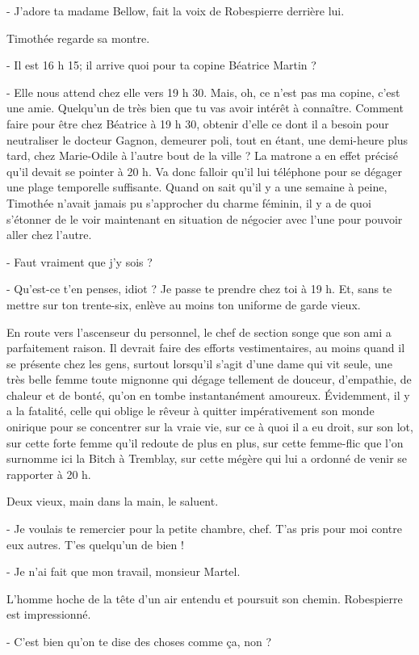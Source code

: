 - J’adore ta madame Bellow, fait la voix de Robespierre derrière lui.

Timothée regarde sa montre.

- Il est 16 h 15; il arrive quoi pour ta copine Béatrice Martin ?

- Elle nous attend chez elle vers 19 h 30. Mais, oh, ce n’est pas ma copine, c’est une amie. Quelqu’un de très bien que tu vas avoir intérêt à connaître.
Comment faire pour être chez Béatrice à 19 h 30, obtenir d’elle ce dont il a besoin pour neutraliser le docteur Gagnon, demeurer poli, tout en étant, une demi-heure plus tard, chez Marie-Odile à l’autre bout de la ville ? La matrone a en effet précisé qu’il devait se pointer à 20 h. Va donc falloir qu’il lui téléphone pour se dégager une plage temporelle suffisante. Quand on sait qu’il y a une semaine à peine, Timothée n’avait jamais pu s’approcher du charme féminin, il y a de quoi s’étonner de le voir maintenant en situation de négocier avec l’une pour pouvoir aller chez l’autre.

- Faut vraiment que j’y sois ?

- Qu’est-ce t’en penses, idiot ? Je passe te prendre chez toi à 19 h. Et, sans te mettre sur ton trente-six, enlève au moins ton uniforme de garde vieux.

En route vers l’ascenseur du personnel, le chef de section songe que son ami a parfaitement raison. Il devrait faire des efforts vestimentaires, au moins quand il se présente chez les gens, surtout lorsqu’il s’agit d’une dame qui vit seule, une très belle femme toute mignonne qui dégage tellement de douceur, d’empathie, de chaleur et de bonté, qu’on en tombe instantanément amoureux. Évidemment, il y a la fatalité, celle qui oblige le rêveur à quitter impérativement son monde onirique pour se concentrer sur la vraie vie, sur ce à quoi il a eu droit, sur son lot, sur cette forte femme qu’il redoute de plus en plus, sur cette femme-flic que l’on surnomme ici la Bitch à Tremblay, sur cette mégère qui lui a ordonné de venir se rapporter à 20 h.

Deux vieux, main dans la main, le saluent.

- Je voulais te remercier pour la petite chambre, chef. T’as pris pour moi contre eux autres. T’es quelqu’un de bien !

- Je n’ai fait que mon travail, monsieur Martel.

L’homme hoche de la tête d’un air entendu et poursuit son chemin. Robespierre est impressionné.

- C’est bien qu’on te dise des choses comme ça, non ?

